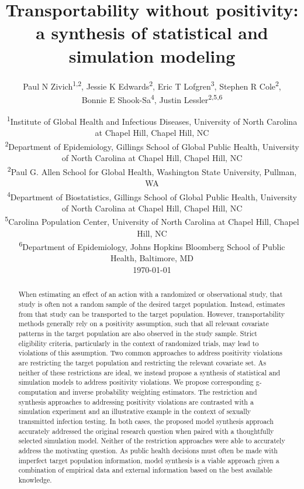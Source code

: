\documentclass[]{article}
\title{Transportability without positivity: a synthesis of statistical and simulation modeling}
\author{Paul N Zivich\textsuperscript{1,2}, 
	    Jessie K Edwards\textsuperscript{2}, 
	    Eric T Lofgren\textsuperscript{3}, 
	    Stephen R Cole\textsuperscript{2}, \\
	    Bonnie E Shook-Sa\textsuperscript{4}, 
	    Justin Lessler\textsuperscript{2,5,6}}
\date{%
	\small
	\textsuperscript{1}Institute of Global Health and Infectious Diseases, University of North Carolina at Chapel Hill, Chapel Hill, NC\\%
	\textsuperscript{2}Department of Epidemiology, Gillings School of Global Public Health, University of North Carolina at Chapel Hill, Chapel Hill, NC\\%
	\textsuperscript{2}Paul G. Allen School for Global Health, Washington State University, Pullman, WA\\%
	\textsuperscript{4}Department of Biostatistics, Gillings School of Global Public Health, University of North Carolina at Chapel Hill, Chapel Hill, NC\\%
	\textsuperscript{5}Carolina Population Center, University of North Carolina at Chapel Hill, Chapel Hill, NC\\[2ex]%
	\textsuperscript{6}Department of Epidemiology, Johns Hopkins Bloomberg School of Public Health, Baltimore, MD\\[2ex]%
	\today
}
\begin{document}
\maketitle

\begin{abstract}
	When estimating an effect of an action with a randomized or observational study, that study is often not a random sample of the desired target population. Instead, estimates from that study can be transported to the target population. However, transportability methods generally rely on a positivity assumption, such that all relevant covariate patterns in the target population are also observed in the study sample. Strict eligibility criteria, particularly in the context of randomized trials, may lead to violations of this assumption. Two common approaches to address positivity violations are restricting the target population and restricting the relevant covariate set. As neither of these restrictions are ideal, we instead propose a synthesis of statistical and simulation models to address positivity violations. We propose corresponding g-computation and inverse probability weighting estimators. The restriction and synthesis approaches to addressing positivity violations are contrasted with a simulation experiment and an illustrative example in the context of sexually transmitted infection testing. In both cases, the proposed model synthesis approach accurately addressed the original research question when paired with a thoughtfully selected simulation model. Neither of the restriction approaches were able to accurately address the motivating question. As public health decisions must often be made with imperfect target population information, model synthesis is a viable approach given a combination of empirical data and external information based on the best available knowledge.
\end{abstract}
\end{document}
